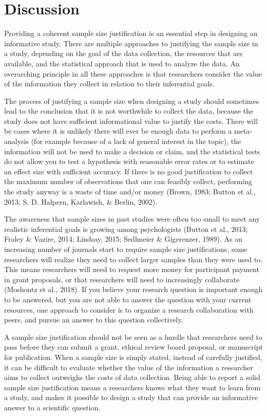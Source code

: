 \documentclass[
  english,
  ,jou, a4paper,floatsintext]{apa6}
\begin{document}
\hypertarget{discussion}{%
\section{Discussion}\label{discussion}}

Providing a coherent sample size justification is an essential step in designing an informative study. There are multiple approaches to justifying the sample size in a study, depending on the goal of the data collection, the resources that are available, and the statistical approach that is used to analyze the data. An overarching principle in all these approaches is that researchers consider the value of the information they collect in relation to their inferential goals.

The process of justifying a sample size when designing a study should sometimes lead to the conclusion that it is not worthwhile to collect the data, because the study does not have sufficient informational value to justify the costs. There will be cases where it is unlikely there will ever be enough data to perform a meta-analysis (for example because of a lack of general interest in the topic), the information will not be used to make a decision or claim, and the statistical tests do not allow you to test a hypothesis with reasonable error rates or to estimate an effect size with sufficient accuracy. If there is no good justification to collect the maximum number of observations that one can feasibly collect, performing the study anyway is a waste of time and/or money (Brown, 1983; Button et al., 2013; S. D. Halpern, Karlawish, \& Berlin, 2002).

The awareness that sample sizes in past studies were often too small to meet any realistic inferential goals is growing among psychologists (Button et al., 2013; Fraley \& Vazire, 2014; Lindsay, 2015; Sedlmeier \& Gigerenzer, 1989). As an increasing number of journals start to require sample size justifications, some researchers will realize they need to collect larger samples than they were used to. This means researchers will need to request more money for participant payment in grant proposals, or that researchers will need to increasingly collaborate (Moshontz et al., 2018). If you believe your research question is important enough to be answered, but you are not able to answer the question with your current resources, one approach to consider is to organize a research collaboration with peers, and pursue an answer to this question collectively.

A sample size justification should not be seen as a hurdle that researchers need to pass before they can submit a grant, ethical review board proposal, or manuscript for publication. When a sample size is simply stated, instead of carefully justified, it can be difficult to evaluate whether the value of the information a researcher aims to collect outweighs the costs of data collection. Being able to report a solid sample size justification means a researchers knows what they want to learn from a study, and makes it possible to design a study that can provide an informative answer to a scientific question.
\end{document}
